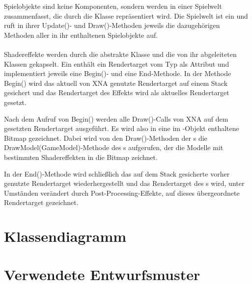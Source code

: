 Spielobjekte sind keine Komponenten, sondern werden in einer Spielwelt zusammenfasst, die durch die Klasse  repräsentiert wird. Die Spielwelt ist ein  und ruft in ihrer Update()- und Draw()-Methoden jeweils die dazugehörigen Methoden aller in ihr enthaltenen Spielobjekte auf.
\\\\
Shadereffekte werden durch die abstrakte Klasse  und die von ihr abgeleiteten Klassen gekapselt. Ein  enthält ein Rendertarget vom Typ  als Attribut und implementiert jeweils eine Begin()- und eine End-Methode. In der Methode Begin() wird das aktuell von XNA genutzte Rendertarget auf einem Stack gesichert und das Rendertarget des Effekts wird als aktuelles Rendertarget gesetzt.

Nach dem Aufruf von Begin() werden alle Draw()-Calls von XNA auf dem gesetzten Rendertarget ausgeführt. Es wird also in eine im -Objekt enthaltene Bitmap gezeichnet. Dabei wird von den Draw()-Methoden der s die DrawModel(GameModel)-Methode des s aufgerufen, der die Modelle mit bestimmten Shadereffekten in die Bitmap zeichnet.

In der End()-Methode wird schließlich das auf dem Stack gesicherte vorher genutzte Rendertarget wiederhergestellt und das Rendertarget des s wird, unter Umständen verändert durch Post-Processing-Effekte, auf dieses übergeordnete Rendertarget gezeichnet.



\section{Klassendiagramm}

\section{Verwendete Entwurfsmuster}

